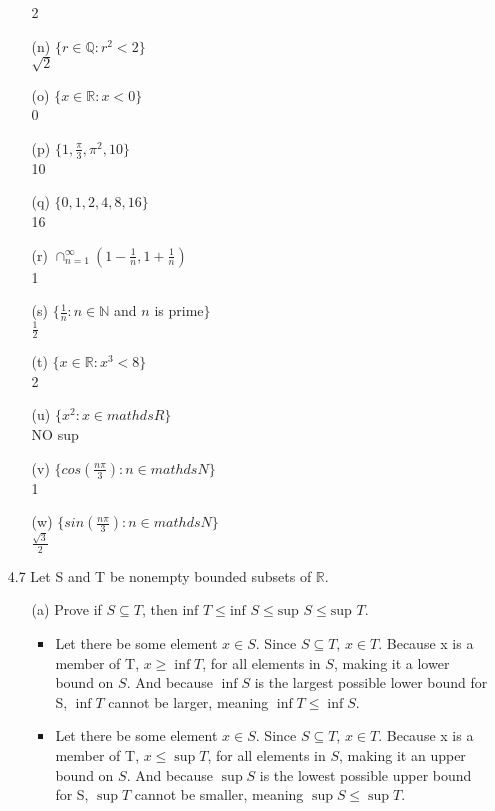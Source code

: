 \begin{itemize}
\begin{itemize}
        2
      \item [(n)] $\{r \in \mathds{Q} : r^2 < 2\}$\\
        $\sqrt{2}$
      \item [(o)] $\{x \in \mathds{R} : x < 0\}$\\
        0
      \item [(p)] $\{1, \frac{\pi}{3}, \pi^2, 10\}$\\
        10
      \item [(q)] $\{0,1,2,4,8,16\}$\\
        16
      \item [(r)] $\cap_{n=1}^\infty (1 - \frac{1}{n}, 1 + \frac{1}{n})$\\
        1
      \item [(s)] $\{\frac{1}{n} : n \in \mathds{N}$ and $n$ is prime$\}$\\
        $\frac{1}{2}$
      \item [(t)] $\{x \in \mathds{R} : x^3 < 8\}$\\
        2
      \item [(u)] $\{x^2 : x \in mathds{R}\}$\\
        NO sup
      \item [(v)] $\{cos(\frac{n\pi}{3}) : n \in mathds{N}\}$\\
        1
      \item [(w)] $\{sin(\frac{n\pi}{3}) : n \in mathds{N}\}$\\
        $\frac{\sqrt{3}}{2}$
    \end{itemize}

  \item [4.7] Let S and T be nonempty bounded subsets of $\mathds{R}$.
    \begin{itemize}
      \item [(a)] Prove if $S \subseteq T$, then $\text{inf } T \leq \text{inf } S \leq \text{sup } S \leq \text{sup } T$.\\
        \begin{itemize}
          \item Let there be some element $x \in S$. Since $S \subseteq T$, $x \in T$. Because x is a member of T, $x \geq \inf T$, for all elements in $S$, making it a lower bound on $S$. And because $\inf S$ is the largest possible lower bound for S, $\inf T$ cannot be larger, meaning $\inf T \leq \inf S$.

          \item Let there be some element $x \in S$. Since $S \subseteq T$, $x \in T$. Because x is a member of T, $x \leq \sup T$, for all elements in $S$, making it an upper bound on $S$. And because $\sup S$ is the lowest possible upper bound for S, $\sup T$ cannot be smaller, meaning $\sup S \leq \sup T$.


\end{itemize}
\end{itemize}
\end{itemize}
